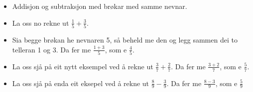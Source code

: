 \documentclass[english,hidelinks,pdftex, 11 pt, class=report,crop=false]{standalone}
\begin{document}
\begin{itemize}
\item  Addisjon og subtraksjon med brøkar med samme nevnar.
\item La oss no rekne ut $\frac{1}{5}+\frac{3}{5} $.
\item Sia begge brøkan he nevnaren 5, så beheld me den og legg sammen dei to telleran 1 og 3. Da fer me $ \frac{1+3}{5} $, som e $ \frac{4}{5} $.
\item La oss sjå på eit nytt eksempel ved å rekne ut $ \frac{3}{7}+\frac{2}{7} $. Da fer me $ \frac{3+2}{7} $, som e $ \frac{5}{7} $.
\item La oss sjå på enda eit eksepel ved å rekne ut $ \frac{8}{9}-\frac{3}{9} $. Da fer me $ \frac{8-3}{9} $, som e $ \frac{5}{9} $
\end{itemize}
\end{document}
